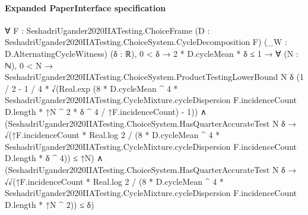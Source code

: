 \documentclass[10pt]{article}
\begin{document}
\paragraph{Expanded PaperInterface specification}
\begin{ReviewVerbatim}
∀ {F : SeshadriUgander2020IIATesting.ChoiceFrame} (D : SeshadriUgander2020IIATesting.ChoiceSystem.CycleDecomposition F)
  (_W : D.AlternatingCycleWitness) (δ : ℝ),
  0 < δ →
    2 * D.cycleMean * δ ≤ 1 →
      ∀ (N : ℕ),
        0 < N →
          SeshadriUgander2020IIATesting.ChoiceSystem.ProductTestingLowerBound N δ
              (1 / 2 -
                1 / 4 *
                  √(Real.exp
                        (8 * D.cycleMean ^ 4 *
                                SeshadriUgander2020IIATesting.CycleMixture.cycleDispersion F.incidenceCount D.length *
                              ↑N ^ 2 *
                            δ ^ 4 /
                          ↑F.incidenceCount) -
                      1)) ∧
            (SeshadriUgander2020IIATesting.ChoiceSystem.HasQuarterAccurateTest N δ →
                √(↑F.incidenceCount * Real.log 2 /
                      (8 * D.cycleMean ^ 4 *
                          SeshadriUgander2020IIATesting.CycleMixture.cycleDispersion F.incidenceCount D.length *
                        δ ^ 4)) ≤
                  ↑N) ∧
              (SeshadriUgander2020IIATesting.ChoiceSystem.HasQuarterAccurateTest N δ →
                √√(↑F.incidenceCount * Real.log 2 /
                        (8 * D.cycleMean ^ 4 *
                            SeshadriUgander2020IIATesting.CycleMixture.cycleDispersion F.incidenceCount D.length *
                          ↑N ^ 2)) ≤
                  δ)
\end{ReviewVerbatim}
\end{document}
